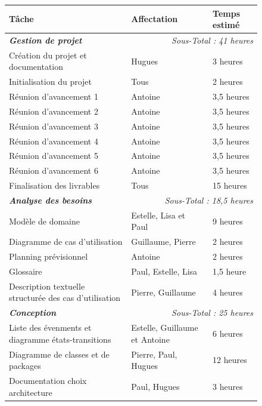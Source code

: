\documentclass[paper=a4, fontsize=11pt]{report}
\numberwithin{equation}{section}		%
\numberwithin{figure}{section}		%
\numberwithin{table}{section}		%
\renewcommand{\bf}[1]{\textbf{#1}}
\renewcommand{\it}[1]{\textit{#1}}
\newcommand{\bfit}[1]{\textbf{\textit{#1}}}
\begin{document}
\begin{figure}[H]
\begin{center}
\begin{tabular}{  l  l  l  }
  \hline
  \bf{Tâche} & \bf{Affectation} & \bf{Temps estimé} \\
  \hline
  \hline
  \bfit{Gestion de projet} & \multicolumn{2}{r}{\it{Sous-Total : 41 heures}} \\
  \hline
  Création du projet et documentation & Hugues & 3 heures \\
  \hline
  Initialisation du projet & Tous & 2 heures \\
  \hline
  Réunion d'avancement 1 & Antoine & 3,5 heures \\
  \hline
  Réunion d'avancement 2 & Antoine & 3,5 heures \\
  \hline
  Réunion d'avancement 3 & Antoine & 3,5 heures \\
  \hline
  Réunion d'avancement 4 & Antoine & 3,5 heures \\
  \hline
  Réunion d'avancement 5 & Antoine & 3,5 heures \\
  \hline
  Réunion d'avancement 6 & Antoine & 3,5 heures \\
  \hline
  Finalisation des livrables & Tous & 15 heures \\
  \hline
  \hline
  \bfit{Analyse des besoins} & \multicolumn{2}{r}{\it{Sous-Total : 18,5 heures}} \\
  \hline
  Modèle de domaine & Estelle, Lisa et Paul & 9 heures \\
  \hline
  Diagramme de cas d'utilisation & Guillaume, Pierre & 2 heures \\
  \hline
  Planning prévisionnel & Antoine & 2 heures \\
  \hline
  Glossaire & Paul, Estelle, Lisa & 1,5 heure \\
  \hline
  Description textuelle structurée des cas d'utilisation & Pierre, Guillaume & 4 heures \\
  \hline
  \hline
  \bfit{Conception} & \multicolumn{2}{r}{\it{Sous-Total : 25 heures}} \\
  \hline
  Liste des évenments et diagramme états-transitions & Estelle, Guillaume et Antoine & 6 heures \\
  \hline
  Diagramme de classes et de packages & Pierre, Paul, Hugues & 12 heures \\
  \hline
  Documentation choix architecture & Paul, Hugues & 3 heures \\

\end{tabular}
\end{center}
\end{figure}
\end{document}
